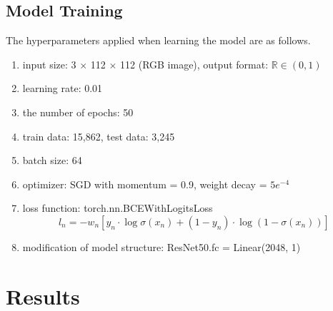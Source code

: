 \documentclass{article}
\begin{document}
\subsection{Model Training}
The hyperparameters applied when learning the model are as follows.
\begin{enumerate}[(1)]\setlength{\itemsep}{-1mm}
	\item input size: 3 $\times$ 112 $\times$ 112 (RGB image), output format: $\mathbb{R} \in (0, 1)$
	\item learning rate: 0.01
	\item the number of epochs: 50
	\item train data: 15,862, test data: 3,245
	\item batch size: 64
	\item optimizer: SGD with momentum = 0.9, weight decay = $5e^{-4}$
	\item loss function: torch.nn.BCEWithLogitsLoss
	\begin{equation} \label{crossentropy}
		l_n = -w_n[y_n \cdot \log \sigma (x_n) + (1 - y_n) \cdot \log (1 - \sigma (x_n))]
	\end{equation}

\item modification of model structure: ResNet50.fc = Linear(2048, 1)

\end{enumerate}

\section{Results}
\end{document}
